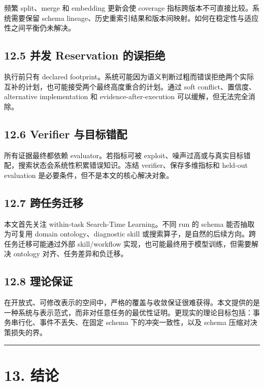 \documentclass[
  11pt]{ctexart}
\begin{document}
频繁 split、merge 和 embedding 更新会使 coverage
指标跨版本不可直接比较。系统需要保留 schema
lineage、历史重索引结果和版本间映射。如何在稳定性与适应性之间平衡仍未解决。

\subsection{12.5 并发 Reservation
的误拒绝}\label{ux5e76ux53d1-reservation-ux7684ux8befux62d2ux7edd}

执行前只有 declared
footprint。系统可能因为语义判断过粗而错误拒绝两个实际互补的计划，也可能接受两个最终高度重合的计划。通过
soft conflict、置信度、alternative implementation 和
evidence-after-execution 可以缓解，但无法完全消除。

\subsection{12.6 Verifier
与目标错配}\label{verifier-ux4e0eux76eeux6807ux9519ux914d}

所有证据最终都依赖 evaluator。若指标可被
exploit、噪声过高或与真实目标错配，搜索状态会系统性积累错误知识。冻结
verifier、保存多维指标和 held-out evaluation
是必要条件，但不是本文的核心解决对象。

\subsection{12.7 跨任务迁移}\label{ux8de8ux4efbux52a1ux8fc1ux79fb}

本文首先关注 within-task Search-Time Learning。不同 run 的 schema
能否抽取为可复用 domain ontology、diagnostic skill
或搜索算子，是自然的后续方向。跨任务迁移可能通过外部 skill/workflow
实现，也可能最终用于模型训练，但需要解决 ontology
对齐、任务差异和负迁移。

\subsection{12.8 理论保证}\label{ux7406ux8bbaux4fddux8bc1}

在开放式、可修改表示的空间中，严格的覆盖与收敛保证很难获得。本文提供的是一种系统与表示范式，而非对任意任务的最优性证明。更现实的理论目标包括：事务串行化、事件不丢失、在固定
schema 下的冲突一致性，以及 schema 压缩对决策损失的界。

\begin{center}\rule{0.5\linewidth}{0.5pt}\end{center}

\section{13. 结论}\label{ux7ed3ux8bba}
\end{document}
